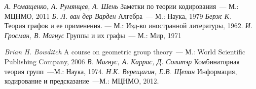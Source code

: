 
\begin{itemize}
 \textit{А. Ромащенко, А. Румянцев, А. Шень} Заметки по теории кодирования~--- М.: МЦНМО, 2011
 \textit{Б. Л. ван дер Варден} Алгебра~--- М.: Наука, 1979
 \textit{Берж К.} Теория графов и ее применения. — М.: Изд-во иностранной литературы, 1962.
 \textit{И. Гросман, В. Магнус} Группы и их графы~--- М.: Мир, 1971

 \textit{Brian H. Bowditch} A course on geometric group theory~--- М.: World Scientific Publishing Company, 2006
 \textit{В. Магнус, А. Каррас, Д. Солитэр} Комбинаторная теория групп~---М.: Наука, 1974.
 \textit{Н.К. Верещагин, Е.В. Щепин} Информация, кодирование и предсказание~---М.: МЦНМО, 2012.
\end{itemize}